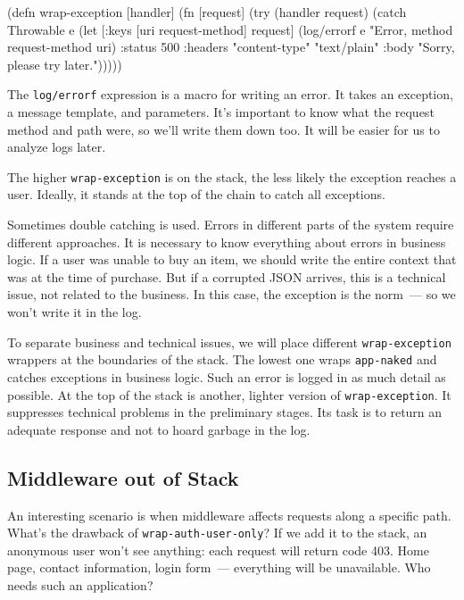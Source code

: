 \begin{english}
\begin{clojure}
(defn wrap-exception [handler]
(fn [request]
(try
(handler request)
(catch Throwable e
(let [{:keys [uri request-method]} request]
(log/errorf e "Error, method %
request-method uri)
{:status 500
:headers {"content-type" "text/plain"}
:body "Sorry, please try later."})))))
\end{clojure}
\end{english}


The \verb|log/errorf| expression is a macro for writing an error. It takes an exception, a message template, and parameters. It's important to know what the request method and path were, so we'll write them down too. It will be easier for us to analyze logs later.

The higher \verb|wrap-exception| is on the stack, the less likely the exception reaches a user. Ideally, it stands at the top of the chain to catch all exceptions.

Sometimes double catching is used. Errors in different parts of the system require different approaches. It is necessary to know everything about errors in business logic. If a user was unable to buy an item, we should write the entire context that was at the time of purchase. But if a corrupted JSON arrives, this is a technical issue, not related to the business. In this case, the exception is the norm~--- so we won't write it in the log.

To separate business and technical issues, we will place different \verb|wrap-exception| wrappers at the boundaries of the stack. The lowest one wraps \verb|app-naked| and catches exceptions in business logic. Such an error is logged in as much detail as possible. At the top of the stack is another, lighter version of \verb|wrap-exception|.
It suppresses technical problems in the preliminary stages. Its task is to return an adequate response and not to hoard garbage in the log.

\subsection{Middleware out of Stack}


An interesting scenario is when middleware affects requests along a specific path. What's the drawback of \verb|wrap-auth-user-only|? If we add it to the stack, an anonymous user won't see anything: each request will return code 403. Home page, contact information, login form~--- everything will be unavailable. Who needs such an application?


